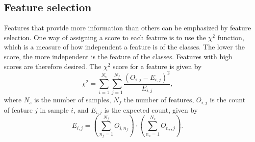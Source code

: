 \subsection{Feature selection}
Features that provide more information than others can be emphasized by feature selection. One way of assigning a score to each feature is to use the $\chi^2$ function, which is a measure of how independent a feature is of the classes. The lower the score, the more independent is the feature of the classes. Features with high scores are therefore desired. The $\chi^2$ score for a feature is given by
\[
\chi^2 = \sum_{i=1}^{N_s} \sum_{j=1}^{N_f} \frac{\left ( O_{i,j} - E_{i,j} \right )^2}{E_{i,j}},
\]
where $N_s$ is the number of samples, $N_f$ the number of features, $O_{i,j}$ is the count of feature $j$ in sample $i$, and $E_{i,j}$ is the expected count, given by
\[
E_{i,j} = \left ( \sum_{n_f=1}^{N_f} O_{i,n_f} \right ) \cdot \left ( \sum_{n_s=1}^{N_s} O_{n_s,j} \right ).
\]